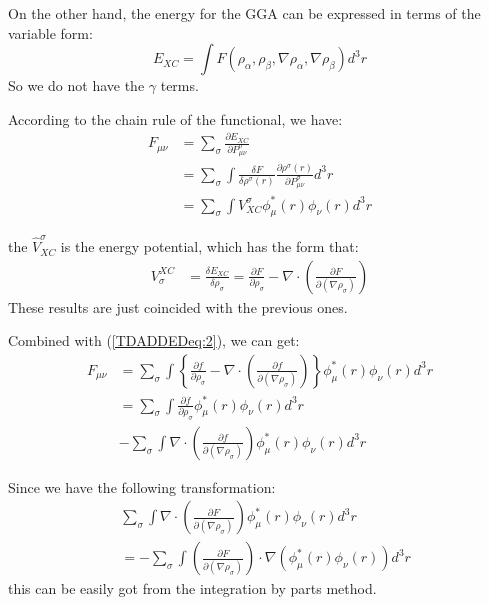 On the other hand, the energy for the GGA can be expressed in terms
of the variable form:
\begin{equation}
 E_{XC} = \int F(\rho_{\alpha}, \rho_{\beta}, \nabla\rho_{\alpha},
\nabla\rho_{\beta})d^{3}r
\end{equation} 
So we do not have the $\gamma$ terms.

According to the chain rule of the functional, we have:
\begin{align}\label{TDADDEDeq:2}
F_{\mu\nu} &= \sum_{\sigma}\frac{\partial E_{XC}}{\partial
P^{\sigma}_{\mu\nu}}
\nonumber \\
&=
\sum_{\sigma}\int \frac{\delta F}{\delta
  \rho^{\sigma}(r)}\frac{\partial \rho^{\sigma}(r)}{\partial
P^{\sigma}_{\mu\nu}} d^{3}r
\nonumber \\
&= \sum_{\sigma}\int V^{\sigma}_{XC}
\phi^{*}_{\mu}(r)\phi_{\nu}(r) d^{3}r
\end{align}

the $\hat{V}^{\sigma}_{XC}$ is the energy potential, which has the
form
that:
 \begin{align}
  \label{TDADDEDeq:3}
  V_{\sigma}^{XC} &= \frac{\delta E_{XC}} {\delta \rho_{\sigma}} =
  \frac{\partial F} {\partial \rho_{\sigma}} - \nabla\cdot \left(
    \frac{\partial F}{\partial (\nabla\rho_{\sigma})}
  \right) 
\end{align} 
These results are just coincided with the previous ones.

Combined with (\ref{TDADDEDeq:2}), we can get:
\begin{align}\label{TDADDEDeq:4}
F_{\mu\nu} &= 
\sum_{\sigma}\int \left\lbrace \frac{\partial f} {\partial
\rho_{\sigma}} - \nabla\cdot \left(
    \frac{\partial f}{\partial (\nabla\rho_{\sigma})}
  \right) \right\rbrace 
\phi^{*}_{\mu}(r)\phi_{\nu}(r) d^{3}r \nonumber \\
&=  \sum_{\sigma}\int \frac{\partial f} {\partial
\rho_{\sigma}} \phi^{*}_{\mu}(r)\phi_{\nu}(r) d^{3}r \nonumber \\
&- \sum_{\sigma}\int 
\nabla\cdot \left(
    \frac{\partial f}{\partial (\nabla\rho_{\sigma})}
  \right) 
\phi^{*}_{\mu}(r)\phi_{\nu}(r) d^{3}r 
\end{align}

Since we have the following transformation:
\begin{align}
 &\sum_{\sigma}\int 
\nabla\cdot \left(
    \frac{\partial F}{\partial (\nabla\rho_{\sigma})}
  \right) 
\phi^{*}_{\mu}(r)\phi_{\nu}(r) d^{3}r \nonumber \\
&= -\sum_{\sigma}\int 
 \left(
    \frac{\partial F}{\partial (\nabla\rho_{\sigma})}
  \right)\cdot 
\nabla(\phi^{*}_{\mu}(r)\phi_{\nu}(r)) d^{3}r 
\end{align} 
this can be easily got from the integration by parts method.

